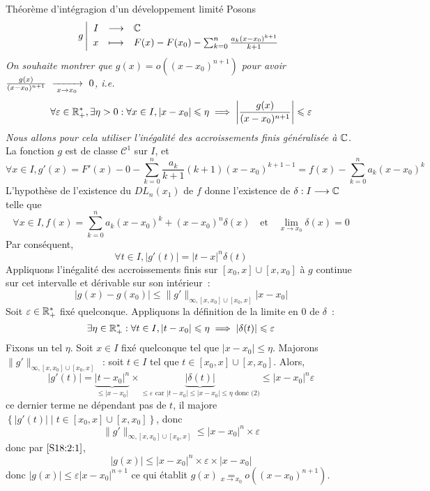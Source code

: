 \documentclass{article}
\renewenvironment{question_kholle}[2][ ]
{
	\subsection{\texorpdfstring{#2}{}}
	\notblank{#1}
	{
		\noindent #1
		\bigbreak
	}
	{}
	\begin{proof}
}
{
	\end{proof}
}
\begin{document}
\begin{question_kholle}{Théorème d’intégragion d’un développement limité}
	Posons
	\[
		g\left|\begin{array}{rcl} I & \longrightarrow & \mathbb C \\ x & \longmapsto & F(x)-F(x_{0}) - \sum_{k=0}^{n}\frac{a_{k}(x-x_{0})^{k+1}}{k+1} \end{array}\right.
	\]
	\textit{On souhaite montrer que $g(x)=o((x-x_{0})^{n+1})$ pour avoir $\frac{g(x)}{(x-x_{0})^{n+1}}\ \xrightarrow[\;x \to x_{0}\;]{}\ 0$, i.e.
	\[
		\forall \varepsilon\in\mathbb R_{+}^{*}, \exists \eta>0: \forall x\in I, |x-x_{0}|\leqslant \eta \implies  \left|\frac{g(x)}{(x-x_{0})^{n+1}}\right| \leqslant \varepsilon
	\]Nous allons pour cela utiliser l’inégalité des accroissements finis généralisée à $\mathbb C$.}
	La fonction $g$ est de classe $\mathcal C^{1}$ sur $I$, et
	\[
		\forall x\in I, g'(x)=F'(x)-0-\sum_{k=0}^{n}\frac{a_{k}}{k+1}(k+1)(x-x_{0})^{k+1-1} = f(x)-\sum_{k=0}^{n}a_{k}(x-x_{0})^{k}
	\]
	L’hypothèse de l’existence du $DL_{n}(x_{1})$ de $f$ donne l’existence de $\delta:I\longrightarrow \mathbb C$ telle que
	\[
		\forall x\in I, f(x)=\sum_{k=0}^{n}a_{k}(x-x_{0})^{k}+(x-x_{0})^{n}\delta(x) \quad\text{et}\quad \lim_{x\to x_{0}}\delta(x)=0
	\]
	Par conséquent,
	\[
		\forall t\in I, |g'(t)| = |t-x|^{n}\delta(t)
	\]
	Appliquons l’inégalité des accroissements finis sur $[x_{0}, x]\cup [x, x_{0}]$ à $g$ continue sur cet intervalle et dérivable sur son intérieur~:
	\begin{equation}\label{S18:2:1}
		|g(x)-g(x_{0})| \leq \|g'\|_{\infty, [x, x_{0}]\cup[x_{0}, x]}|x-x_{0}|
	\end{equation}
	Soit $\varepsilon\in\mathbb R_{+}^{*}$ fixé quelconque. Appliquons la définition de la limite en $0$ de $\delta$~:
	\begin{equation*}\label{S18:2:2}
		\exists \eta\in\mathbb R_{+}^{*}: \forall t\in I, |t-x_{0}|\leqslant \eta \implies  |\delta(t)| \leqslant \varepsilon
	\end{equation*}
	Fixons un tel $\eta$. Soit $x\in I$ fixé quelconque tel que $|x-x_{0}|\leq \eta$. Majorons $\|g'\|_{\infty, [x, x_{0}]\cup[x_{0}, x]}$~: soit $t\in I$ tel que $t\in [x_{0}, x]\cup[x, x_{0}]$. Alors,
	\[
		|g'(t)| = \underbrace{|t-x_{0}|^{n}}_{\leq |x-x_{0}|} \times \underbrace{|\delta(t)|}_{\leq \varepsilon \text{ car $|t-x_{0}|\leq|x-x_{0}|\leq \eta$ donc (2)}} \leq |x-x_{0}|^{n} \varepsilon
	\]
	ce dernier terme ne dépendant pas de $t$, il majore $\left\{|g'(t)| \mid t\in[x_{0}, x]\cup [x, x_{0}]\right\}$, donc
	\[
		\|g'\|_{\infty, [x, x_{0}]\cup[x_{0}, x]}\leq |x-x_{0}|^{n}\times \varepsilon
	\]
	donc par $\eqref{S18:2:1}$,
	\[
		|g(x)| \leq |x-x_{0}|^{n} \times \varepsilon \times |x-x_{0}|
	\]
	donc $|g(x)|\leq \varepsilon|x-x_{0}|^{n+1}$ ce qui établit $g(x)\underset{x\to x_{0}}{=}o((x-x_{0})^{n+1})$.
\end{question_kholle}
\end{document}
